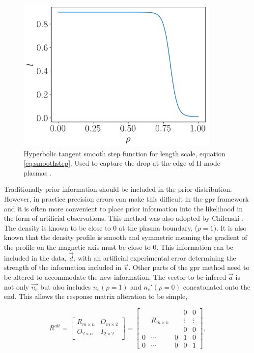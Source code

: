 \begin{figure}[H]
  \centering
  \includegraphics[width=10cm]{images/smoothstep.png}
  \caption{Hyperbolic tangent smooth step function for length scale, equation \ref{eq:smoothstep}. Used to capture the drop at the edge of H-mode plasmas \cite{chilenski}.}
  \label{fig:smoothstep}
\end{figure}


Traditionally prior information should be included in the prior distribution. However, in practice precision errors can make this difficult in the \gls{gpr} framework and it is often more convenient to place prior information into the likelihood in the form of artificial observations. This method was also adopted by Chilenski \cite{chilenski}. The density is known to be close to 0 at the plasma boundary, ($\rho=1$). It is also known that the density profile is smooth and symmetric meaning the gradient of the profile on the magnetic axis must be close to 0. This information can be included in the data, $\vec{d}$, with an artificial experimental error determining the strength of the information included in $\vec{\epsilon}$. Other parts of the \gls{gpr} method need to be altered to accommodate the new information. The vector to be infered $\vec{a}$ is not only $\vec{n_e}$ but also includes $n_e(\rho=1)$ and $n_e'(\rho=0)$ concatonated onto the end. This allows the response matrix alteration to be simple,

\begin{equation}
  R^{alt} = 
\begin{bmatrix}
 R_{m\times n} &   O_{m\times2} \\
 O_{2\times n} &   I_{2\times 2} \\
\end{bmatrix}
=
\begin{bmatrix}
 &       &    & 0         & 0\\
  &   R_{m\times n}    &    &  \vdots  & \vdots\\
  &       &    & 0        & 0\\
0 & \cdots & 0  & 1        & 0 \\
0 & \cdots & 0  & 0        & 1
\end{bmatrix},
  \label{eq:Ralt}
\end{equation}

